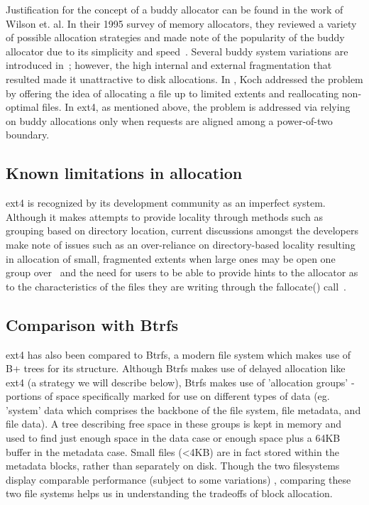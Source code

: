 \documentclass{acm_proc_article-sp}
\begin{document}
  
Justification for the concept of a buddy allocator can be found in the work of Wilson et. al.  In their 1995 survey of memory allocators, they reviewed a variety of possible allocation strategies and made note of the popularity of the buddy allocator due to its simplicity and speed~\cite{cao2008ext4}.  Several buddy system variations are introduced in~\cite{peterson1977buddy}; however, the high internal and external fragmentation that resulted made it unattractive to disk allocations. In \cite{koch1987disk}, Koch addressed the problem by offering the idea of allocating a file up to limited extents and reallocating non-optimal files. In ext4, as mentioned above, the problem is addressed via relying on buddy allocations only when requests are aligned among a power-of-two boundary.

\subsection{Known limitations in allocation}
ext4 is recognized by its development community as an imperfect system.  Although it makes attempts to provide locality through methods such as grouping based on directory location, current discussions amongst the developers make note of issues such as an over-reliance on directory-based locality resulting in allocation of small, fragmented extents when large ones may be open one group over~\cite{FallocateCreating} and the need for users to be able to provide hints to the allocator as to the characteristics of the files they are writing through the fallocate() call~\cite{BlockReservation}.

\subsection{Comparison with Btrfs}
ext4 has also been compared to Btrfs, a modern file system which makes use of B+ trees for its structure.  Although Btrfs makes use of delayed allocation like ext4 (a strategy we will describe below), Btrfs makes use of 'allocation groups' - portions of space specifically marked for use on different types of data (eg. 'system' data which comprises the backbone of the file system, file metadata, and file data).  A tree describing free space in these groups is kept in memory and used to find just enough space in the data case or enough space plus a 64KB buffer in the metadata case.  Small files (<4KB) are in fact stored within the metadata blocks, rather than separately on disk\cite{kara2009ext4}.  Though the two filesystems display comparable performance (subject to some variations) \cite{kebede2012performance}, comparing these two file systems helps us in understanding the tradeoffs of block allocation.
\end{document}
